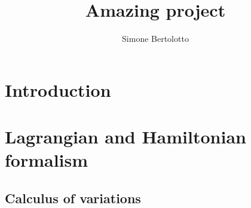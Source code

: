 \documentclass[a4paper]{article}
\title{Amazing project}
\author{Simone Bertolotto}
\theoremstyle{definition}
\begin{document}
  \maketitle
  \newpage

  \begin{abstract}
    \lipsum[1]
  \end{abstract}

  \newpage

  \section{Introduction}
  

  \section{Lagrangian and Hamiltonian formalism}
  

  \newpage
  \begin{appendices}
    \section{Calculus of variations} \label{appendix: calculus of variation}
    
  \end{appendices}

  \newpage
  \printbibliography
\end{document}
